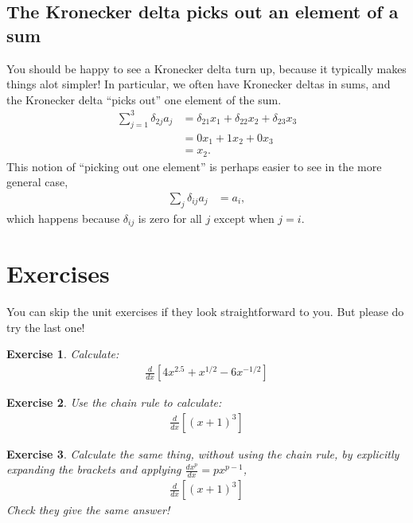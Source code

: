 \documentclass{article}
\newcommand{\dt}[2][]{\frac{d #1}{d #2}}
\newtheorem{exercise}{Exercise}
\begin{document}
\subsection{The Kronecker delta picks out an element of a sum}
You should be happy to see a Kronecker delta turn up, because it typically makes things alot simpler!
In particular, we often have Kronecker deltas in sums, and the Kronecker delta ``picks out'' one element of the sum.
\begin{align}
  \sum_{j=1}^3 \delta_{2 j} a_j &= \delta_{2 1} x_1 + \delta_{2 2} x_2 + \delta_{2 3} x_3 \\
  &= 0 x_1 + 1 x_2 + 0 x_3 \\
  &= x_2.
\end{align}
This notion of ``picking out one element'' is perhaps easier to see in the more general case,
\begin{align}
  \sum_j \delta_{i j} a_j &= a_i,
\end{align}
which happens because $\delta_{ij}$ is zero for all $j$ except when $j=i$.

\clearpage

\section{Exercises}

You can skip the unit exercises if they look straightforward to you.  But please do try the last one!

\begin{exercise}
  Calculate:
  \begin{align}
    \dt{x}[4x^{2.5} + x^{1/2} - 6 x^{-1/2}]
  \end{align}
\end{exercise}

\begin{exercise}
  Use the chain rule to calculate:
  \begin{align}
    \dt{x} [(x+1)^3]
  \end{align}
\end{exercise}

\begin{exercise}
  Calculate the same thing, without using the chain rule, by explicitly expanding the brackets and applying $\dt[x^p]{x} = p x^{p-1}$,
  \begin{align}
    \dt{x} [(x+1)^3]
  \end{align}
  Check they give the same answer!
\end{exercise}
\end{document}
